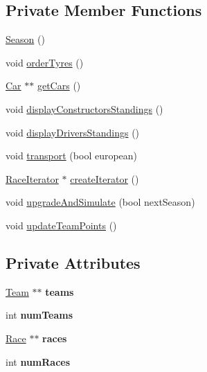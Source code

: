 \subsection*{Private Member Functions}
\begin{DoxyCompactItemize}
\item 
\hyperlink{classSeason_a069a1041ff9a2a2d918ad5e3bb062a08}{Season} ()
\item 
void \hyperlink{classSeason_ad5455ffe0999020706d9068b43baef91}{order\+Tyres} ()
\item 
\hyperlink{classCar}{Car} $\ast$$\ast$ \hyperlink{classSeason_aa51c303aa0ba522f2e95d263995f7791}{get\+Cars} ()
\item 
void \hyperlink{classSeason_ad5fdae208b154f4f0c4f455a61f0f9fc}{display\+Constructors\+Standings} ()
\item 
void \hyperlink{classSeason_a9d5193a7765ebff700e8b80a31e8f2e1}{display\+Drivers\+Standings} ()
\item 
void \hyperlink{classSeason_a28bc89521eec63fe56039c9d1e50c548}{transport} (bool european)
\item 
\hyperlink{classRaceIterator}{Race\+Iterator} $\ast$ \hyperlink{classSeason_af8e26b685e4acd103816f5190efefd54}{create\+Iterator} ()
\item 
void \hyperlink{classSeason_a4eecb09cc35da82444657a9095789dca}{upgrade\+And\+Simulate} (bool next\+Season)
\item 
void \hyperlink{classSeason_ac03a6b5518cfac9b2c6fce755c8f9821}{update\+Team\+Points} ()
\end{DoxyCompactItemize}
\subsection*{Private Attributes}
\begin{DoxyCompactItemize}
\item 
\mbox{\label{classSeason_ac0f6319c56f4fdeba138272e7440b6cb}} 
\hyperlink{classTeam}{Team} $\ast$$\ast$ {\bfseries teams}
\item 
\mbox{\label{classSeason_af88edad60b9ec6d41d34abc4a549432b}} 
int {\bfseries num\+Teams}
\item 
\mbox{\label{classSeason_a45719327bc03b9d99d1a8ed52887f7c6}} 
\hyperlink{classRace}{Race} $\ast$$\ast$ {\bfseries races}
\item 
\mbox{\label{classSeason_a92951ddafbb76573c2996733c3bf12e6}} 
int {\bfseries num\+Races}
\end{DoxyCompactItemize}
